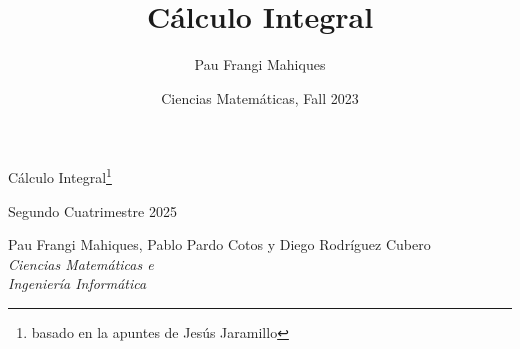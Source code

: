 \documentclass[a4paper,11pt,final]{article}
\title{Cálculo Integral}
\date{Ciencias Matemáticas, Fall 2023}
\author{Pau Frangi Mahiques}
\begin{document}
\begin{titlepage}
    \centering\Large\null\vfill

    {\Huge Cálculo Integral\footnote{basado en la apuntes de Jesús Jaramillo}}\\ 
    \vspace{1em}

    Segundo Cuatrimestre 2025\\
    \vskip8cm

    Pau Frangi Mahiques, Pablo Pardo Cotos y Diego Rodríguez Cubero\\

    \emph{Ciencias Matemáticas e\\Ingeniería Informática}\\
    \vskip4cm
\end{titlepage}

\newpage
\pagestyle{plain}    
\tableofcontents
\newpage


\end{document}
